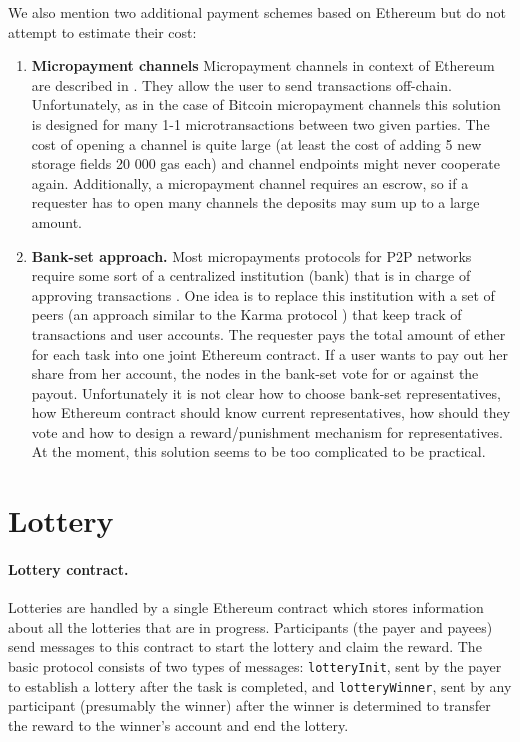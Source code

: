 \documentclass[a4paper]{article}
\begin{document}
    We also mention two additional payment schemes based on Ethereum but do not attempt to estimate their cost:

    \begin{enumerate}
	    \item \textbf{Micropayment channels}
        Micropayment channels in context of Ethereum are described in \cite{BUTERIN}. They allow the user to send
        transactions off-chain. Unfortunately, as in the case of Bitcoin micropayment channels \cite{BITCOINJ} this
        solution is designed for many 1-1 microtransactions between two given parties. The cost of opening a channel
        is quite large (at least the cost of adding 5 new storage fields 20 000 gas each) and channel endpoints might
        never cooperate again. Additionally, a micropayment channel requires an escrow, so if a requester has to open
        many channels the deposits may sum up to a large amount.
	\item \textbf{Bank-set approach.}
        Most micropayments protocols for P2P networks require some sort of a centralized institution (bank) that is
        in charge of approving transactions \cite{JAIN}. One idea is to replace this institution with a set of peers
        (an approach similar to the Karma protocol \cite{VISHNUMURTHY}) that keep track of transactions and user accounts.
        The requester pays the total amount of ether for each task into one joint Ethereum contract.
        If a user wants to pay out her share from her account, the nodes in the bank-set vote for or against the payout.
        Unfortunately it is not clear how to choose bank-set representatives, how Ethereum contract should know
        current representatives, how should they vote and how to design a reward/punishment mechanism
        for representatives. At the moment, this solution seems to be too complicated to be practical.

\end{enumerate}
\section{Lottery}
\label{sec:lottery}
    \paragraph{Lottery contract.}
    Lotteries are handled by a single Ethereum contract which stores information about all the lotteries that are in
    progress. Participants (the payer and payees) send messages to this contract to start the lottery and claim
    the reward. The basic protocol consists of two types of messages: \texttt{lotteryInit}, sent by the payer to
    establish a lottery after the task is completed, and \texttt{lotteryWinner}, sent by any participant
    (presumably the winner) after the winner is determined to transfer the reward to the winner's account and end
    the lottery.
\end{document}
